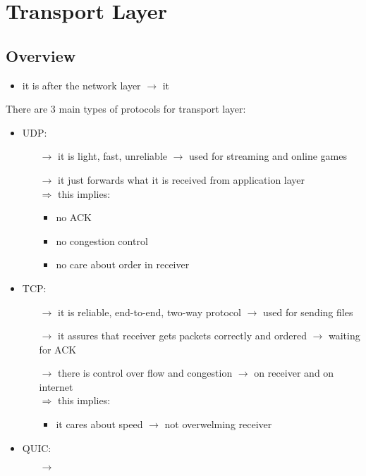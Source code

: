\section{Transport Layer}
\subsection{Overview}
\begin{itemize}
    \item it is after the network layer $\rightarrow$ it 
\end{itemize}
There are 3 main types of protocols for transport layer:
\begin{itemize}
    \item UDP:
    \begin{itemize}
        \item[$\rightarrow$] it is light, fast, unreliable $\rightarrow$ used for streaming and online games
        \item[$\rightarrow$] it just forwards what it is received from application layer\\
        $\Rightarrow$ this implies:
        \begin{itemize}
            \item no ACK
            \item no congestion control
            \item no care about order in receiver
        \end{itemize}
    \end{itemize}
    \item TCP:
    \begin{itemize}
        \item[$\rightarrow$] it is reliable, end-to-end, two-way protocol $\rightarrow$ used for sending files
        \item[$\rightarrow$] it assures that receiver gets packets correctly and ordered $\rightarrow$ waiting for ACK
        \item[$\rightarrow$] there is control over flow and congestion $\rightarrow$ on receiver and on internet\\
        $\Rightarrow$ this implies:
        \begin{itemize}
            \item it cares about speed $\rightarrow$ not overwelming receiver
        \end{itemize}
    \end{itemize}
    \item QUIC:
    \begin{itemize}
        \item[$\rightarrow$]
    \end{itemize}
\end{itemize}
